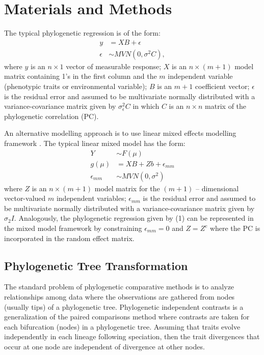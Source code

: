 \section{Materials and Methods}

The typical phylogenetic regression is of the form:
\begin{align}
y & = XB + \epsilon \\
\epsilon & \sim MVN(0,\sigma^{2}C),
\label{eq:gls}
\end{align}
where $y$ is an $n \times 1$ vector of measurable response; $X$ is an $n \times (m + 1)$ model matrix containing 1's in the first column and the $m$ independent variable (phenotypic traits or environmental variable); $B$ is an $m + 1$ coefficient vector; $\epsilon$ is the residual error and assumed to be multivariate normally distributed with a variance-covariance matrix given by $\sigma^{2}_{\epsilon}C$ in which $C$ is an $n \times n$ matrix of the phylogenetic correlation (PC).

An alternative modelling approach is to use linear mixed effects modelling framework \citep{lynch1991methods}.
The typical linear mixed model has the form:
\begin{align}
Y & \sim F(\mu) \\
g(\mu) & = XB + Zb + \epsilon_{mm} \\
\epsilon_{mm} & \sim MVN(0,\sigma^2)
\end{align}
where $Z$ is an $n \times (m+1)$ model matrix for the $(m+1)$ -- dimensional vector-valued $m$ independent variables; $\epsilon_{mm}$ is the residual error and assumed to be multivariate normally distributed with a variance-covariance matrix given by $\sigma_{2}I$.
Analogously, the phylogenetic regression given by (1) can be represented in the mixed model framework by constraining $\epsilon_{mm} = 0$ and $Z=Z^{c}$ where the PC is incorporated in the random effect matrix. 

\subsection{Phylogenetic Tree Transformation}
The standard problem of phylogenetic comparative methods is to analyze relationships among data where the observations are gathered from nodes (usually tips) of a phylogenetic tree.
Phylogenetic independent contrasts is a generalization of the paired comparisons method where contrasts are taken for each bifurcation (nodes) in a phylogenetic tree. 
Assuming that traits evolve independently in each lineage following speciation, then the trait divergences that occur at one node are independent of divergence at other nodes.  

